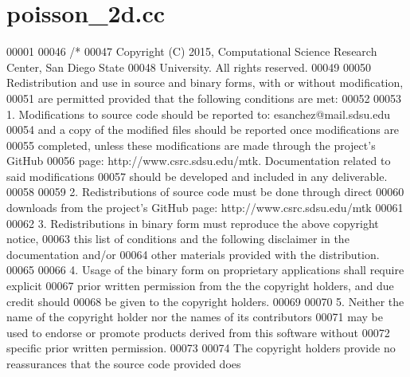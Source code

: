 \hypertarget{poisson__2d_8cc_source}{\section{poisson\+\_\+2d.\+cc}
\label{poisson__2d_8cc_source}
}

\begin{DoxyCode}
00001 
00046 \textcolor{comment}{/*}
00047 \textcolor{comment}{Copyright (C) 2015, Computational Science Research Center, San Diego State}
00048 \textcolor{comment}{University. All rights reserved.}
00049 \textcolor{comment}{}
00050 \textcolor{comment}{Redistribution and use in source and binary forms, with or without modification,}
00051 \textcolor{comment}{are permitted provided that the following conditions are met:}
00052 \textcolor{comment}{}
00053 \textcolor{comment}{1. Modifications to source code should be reported to: esanchez@mail.sdsu.edu}
00054 \textcolor{comment}{and a copy of the modified files should be reported once modifications are}
00055 \textcolor{comment}{completed, unless these modifications are made through the project's GitHub}
00056 \textcolor{comment}{page: http://www.csrc.sdsu.edu/mtk. Documentation related to said modifications}
00057 \textcolor{comment}{should be developed and included in any deliverable.}
00058 \textcolor{comment}{}
00059 \textcolor{comment}{2. Redistributions of source code must be done through direct}
00060 \textcolor{comment}{downloads from the project's GitHub page: http://www.csrc.sdsu.edu/mtk}
00061 \textcolor{comment}{}
00062 \textcolor{comment}{3. Redistributions in binary form must reproduce the above copyright notice,}
00063 \textcolor{comment}{this list of conditions and the following disclaimer in the documentation and/or}
00064 \textcolor{comment}{other materials provided with the distribution.}
00065 \textcolor{comment}{}
00066 \textcolor{comment}{4. Usage of the binary form on proprietary applications shall require explicit}
00067 \textcolor{comment}{prior written permission from the the copyright holders, and due credit should}
00068 \textcolor{comment}{be given to the copyright holders.}
00069 \textcolor{comment}{}
00070 \textcolor{comment}{5. Neither the name of the copyright holder nor the names of its contributors}
00071 \textcolor{comment}{may be used to endorse or promote products derived from this software without}
00072 \textcolor{comment}{specific prior written permission.}
00073 \textcolor{comment}{}
00074 \textcolor{comment}{The copyright holders provide no reassurances that the source code provided does}

\end{DoxyCode}
